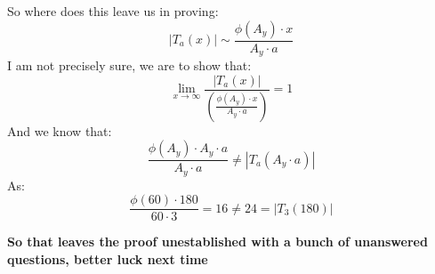 \documentclass[12pt]{amsart}
\theoremstyle{definition}
\numberwithin{equation}{section}
\begin{document}
So where does this leave us in proving:
    $$|T_a(x)|  \sim  \frac{\phi(A_y) \cdot x}{ A_y \cdot a}$$
    I am not precisely sure, we are to show that:
    $$\lim_{x \to \infty} \frac{|T_a(x)|}{\left(\frac{\phi(A_y) \cdot x}{ A_y \cdot a}\right)} =1$$
    And we know that: $$\frac{\phi(A_y) \cdot A_y \cdot a}{ A_y \cdot a} \neq |T_a(A_y \cdot a)|$$
    As: $$\frac{\phi(60) \cdot 180}{ 60 \cdot 3} = 16 \neq  24 = |T_3(180)|$$
    
\textbf{So that leaves the proof unestablished with a bunch of unanswered questions, better luck next time}


 
\end{document}
